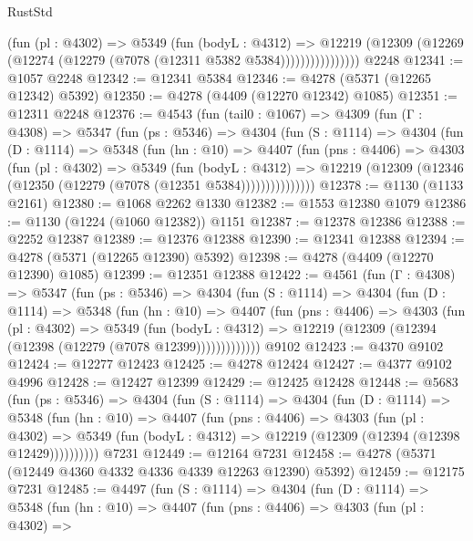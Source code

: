 \begin{lexlean}{RustStd}
\begin{coremodule}
                    (fun (pl : @4302) =>
                    @5349
                      (fun (bodyL : @4312) =>
                      @12219
                        (@12309 (@12269 (@12274 (@12279 (@7078 (@12311 @5382 @5384))))))))))))))))
    @2248
@12341 := @1057 @2248
@12342 := @12341 @5384
@12346 := @4278 (@5371 (@12265 @12342) @5392)
@12350 := @4278 (@4409 (@12270 @12342) @1085)
@12351 := @12311 @2248
@12376 := @4543
    (fun (tail0 : @1067) =>
    @4309
      (fun (Γ : @4308) =>
      @5347
        (fun (ps : @5346) =>
        @4304
          (fun (S : @1114) =>
          @4304
            (fun (D : @1114) =>
            @5348
              (fun (hn : @10) =>
              @4407
                (fun (pns : @4406) =>
                @4303
                  (fun (pl : @4302) =>
                  @5349
                    (fun (bodyL : @4312) =>
                    @12219 (@12309 (@12346 (@12350 (@12279 (@7078 (@12351 @5384)))))))))))))))
@12378 := @1130 (@1133 @2161)
@12380 := @1068 @2262 @1330
@12382 := @1553 @12380 @1079
@12386 := @1130 (@1224 (@1060 @12382)) @1151
@12387 := @12378 @12386
@12388 := @2252 @12387
@12389 := @12376 @12388
@12390 := @12341 @12388
@12394 := @4278 (@5371 (@12265 @12390) @5392)
@12398 := @4278 (@4409 (@12270 @12390) @1085)
@12399 := @12351 @12388
@12422 := @4561
    (fun (Γ : @4308) =>
    @5347
      (fun (ps : @5346) =>
      @4304
        (fun (S : @1114) =>
        @4304
          (fun (D : @1114) =>
          @5348
            (fun (hn : @10) =>
            @4407
              (fun (pns : @4406) =>
              @4303
                (fun (pl : @4302) =>
                @5349
                  (fun (bodyL : @4312) =>
                  @12219 (@12309 (@12394 (@12398 (@12279 (@7078 @12399)))))))))))))
    @9102
@12423 := @4370 @9102
@12424 := @12277 @12423
@12425 := @4278 @12424
@12427 := @4377 @9102 @4996
@12428 := @12427 @12399
@12429 := @12425 @12428
@12448 := @5683
    (fun (ps : @5346) =>
    @4304
      (fun (S : @1114) =>
      @4304
        (fun (D : @1114) =>
        @5348
          (fun (hn : @10) =>
          @4407
            (fun (pns : @4406) =>
            @4303
              (fun (pl : @4302) =>
              @5349 (fun (bodyL : @4312) => @12219 (@12309 (@12394 (@12398 @12429))))))))))
    @7231
@12449 := @12164 @7231
@12458 := @4278 (@5371 (@12449 @4360 @4332 @4336 @4339 @12263 @12390) @5392)
@12459 := @12175 @7231
@12485 := @4497
    (fun (S : @1114) =>
    @4304
      (fun (D : @1114) =>
      @5348
        (fun (hn : @10) =>
        @4407
          (fun (pns : @4406) =>
          @4303
            (fun (pl : @4302) =>

\end{coremodule}
\end{lexlean}
